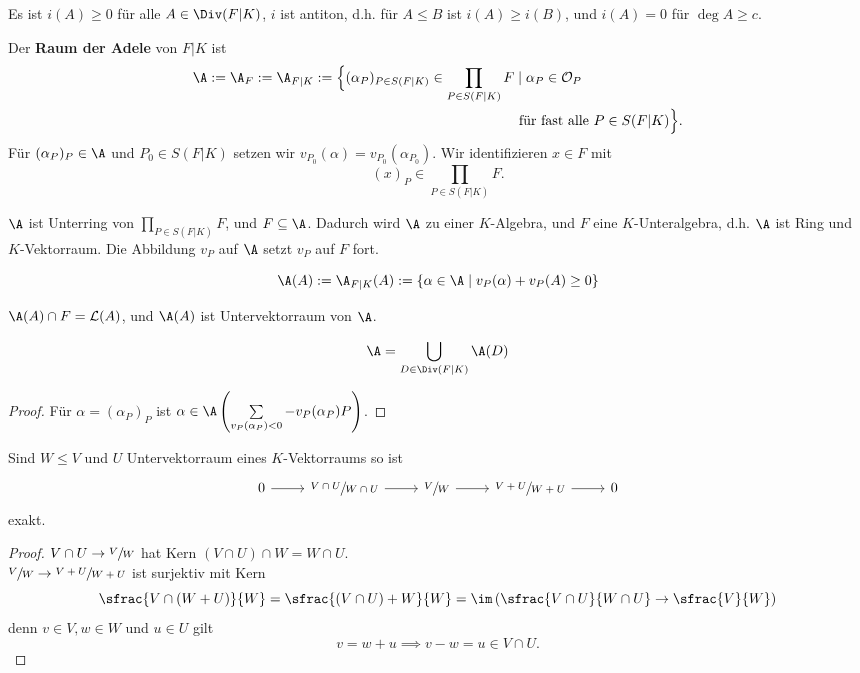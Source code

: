 \begin{bemerkungnr}
    Es ist $i(A) \geq 0$ für alle $A \in \Div(F|K)$,
    $i$ ist antiton, d.h. für $A \leq B$ ist $i(A) \geq i(B)$, und
    $i(A) = 0$ für $\deg A \geq c$.
\end{bemerkungnr}

\begin{definition}
    Der \textbf{Raum der Adele} von $F|K$ ist
    \begin{align*} 
        \A := \A_F := \A_{F|K} := \Big\{(\alpha_P)_{P \in S(F|K)} \in \prod\limits_{P \in S(F|K)} F &\mid \alpha_P \in \mathcal{O}_P\\\
        &\text{ für fast alle } P \in S(F|K)\Big\}.
    \end{align*}
    Für $(\alpha_P)_P \in \A$ und $P_0 \in S(F|K)$ setzen wir $v_{P_0}(\alpha) = v_{P_0}(\alpha_{P_0})$.
    Wir identifizieren $x \in F$ mit $$(x)_P \in \prod\limits_{P \in S(F|K)} F.$$
\end{definition}

\begin{bemerkungnr}
    $\A$ ist Unterring von $\prod\limits_{P \in S(F|K)} F$, und $F \subseteq \A$.
    Dadurch wird $\A$ zu einer $K$-Algebra, und $F$ eine $K$-Unteralgebra, d.h.
    $\A$ ist Ring und $K$-Vektorraum.
    Die Abbildung $v_P$ auf $\A$ setzt $v_P$ auf $F$ fort.
\end{bemerkungnr}

\begin{definition}
    $$\A(A) := \A_{F|K}(A) := \{\alpha \in \A \mid v_P(\alpha) + v_P(A) \geq 0\}$$
\end{definition}

\begin{bemerkungnr}
    $\A(A) \cap F = \mathcal{L}(A)$, und $\A(A)$ ist Untervektorraum von $\A$.
\end{bemerkungnr}

\begin{lemma}
    $$ \A = \bigcup\limits_{D \in \Div(F|K)}\A(D) $$
\end{lemma}
\begin{proof}
    Für $\alpha = (\alpha_P)_P$ ist $\alpha \in \A\left(\sum\limits_{v_P(\alpha_P)<0}-v_P(\alpha_P)P\right)$.
\end{proof}

\begin{lemma}
    Sind $W \leq V$ und $U$ Untervektorraum eines $K$-Vektorraums so ist
    $$\begin{tikzcd}
        0 \ar[r] &\sfrac{V\cap U}{W \cap U} \ar[r] & \sfrac{V}{W} \ar[r] & \sfrac{V + U}{W +U} \ar[r] & 0
    \end{tikzcd}$$
    exakt.
\end{lemma}
\begin{proof}
    $ V \cap U \to \sfrac{V}{W}$ hat Kern $(V \cap U) \cap W = W \cap U$.\\
    $ \sfrac{V}{W} \to \sfrac{V+U}{W+U}$ ist surjektiv mit Kern 
    $$ \sfrac{V \cap (W+U)}{W} = \sfrac{(V \cap U) +W}{W} = \im\left(\sfrac{V \cap U}{W \cap U} \to \sfrac{V}{W}\right)$$
    denn $v \in V,w \in W$ und $u \in U$ gilt
    $$ v=w+u \implies v - w = u \in V \cap U.$$
\end{proof}

